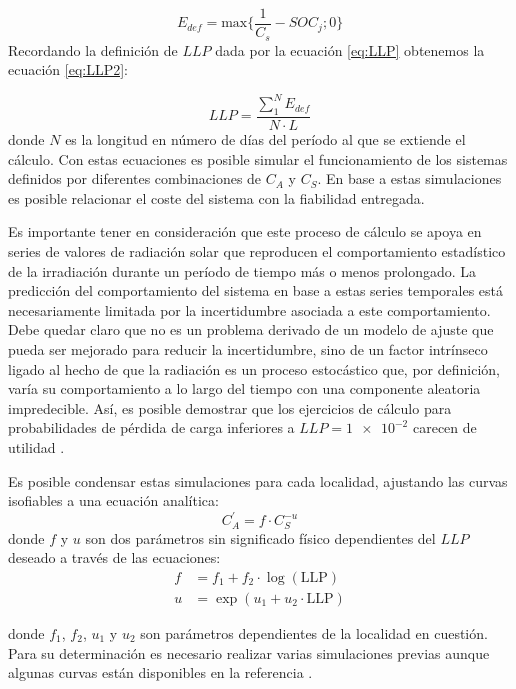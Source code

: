 \begin{equation}
E_{def}=\mathrm{max}\{\frac{1}{C_{s}}-SOC_{j};0\}\label{eq:Edef}\end{equation}
Recordando la definición de $LLP$ dada por la ecuación \ref{eq:LLP}
obtenemos la ecuación \ref{eq:LLP2}:

\begin{equation}
LLP=\frac{\sum_{1}^{N}E_{def}}{N\cdot L}\label{eq:LLP2}\end{equation}
donde $N$ es la longitud en número de días del período al que se
extiende el cálculo. Con estas ecuaciones es posible simular el funcionamiento
de los sistemas definidos por diferentes combinaciones de $C_{A}$
y $C_{S}$. En base a estas simulaciones es posible relacionar el
coste del sistema con la fiabilidad entregada. 

Es importante tener en consideración que este proceso de cálculo se
apoya en series de valores de radiación solar que reproducen el comportamiento
estadístico de la irradiación durante un período de tiempo más o menos
prolongado. La predicción del comportamiento del sistema en base a
estas series temporales está necesariamente limitada por la incertidumbre
asociada a este comportamiento. Debe quedar claro que no es un problema
derivado de un modelo de ajuste que pueda ser mejorado para reducir
la incertidumbre, sino de un factor intrínseco ligado al hecho de
que la radiación es un proceso estocástico que, por definición, varía
su comportamiento a lo largo del tiempo con una componente aleatoria
impredecible. Así, es posible demostrar que los ejercicios de cálculo
para probabilidades de pérdida de carga inferiores a $LLP=\num{1e-2}$
carecen de utilidad \cite{Narvarte2001}.

Es posible condensar estas simulaciones para cada localidad, ajustando
las curvas isofiables a una ecuación analítica:
\begin{equation}
C_{A}^{'} = f\cdot C_{S}^{-u}
\end{equation}
donde $f$ y $u$ son dos parámetros sin significado físico dependientes
del $LLP$ deseado a través de las ecuaciones:
\begin{align}
  f &= f_1 + f_2 \cdot \log(\mathrm{LLP}) \\
  u &= \exp(u_1+u_2 \cdot \mathrm{LLP})
\end{align}

donde $f_1$, $f_2$, $u_1$ y $u_2$ son parámetros dependientes de la
localidad en cuestión. Para su determinación es necesario
realizar varias simulaciones previas aunque algunas curvas están disponibles
en la referencia \cite{Egido.Lorenzo1992}. 

